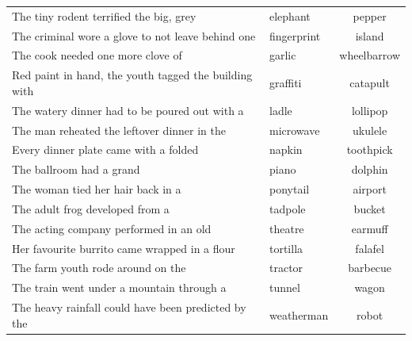 \begin{table}[!h]
\begin{tabular}{llc}
The tiny rodent terrified the big, grey                                      & elephant    & pepper      \\
The criminal wore a glove to not leave behind one                            & fingerprint & island      \\
The cook needed one more clove of                                            & garlic      & wheelbarrow \\
Red paint in hand, the youth tagged the building with                        & graffiti    & catapult    \\
The watery dinner had to be poured out with a                                & ladle       & lollipop    \\
The man reheated the leftover dinner in the                                  & microwave   & ukulele     \\
Every dinner plate came with a folded                                        & napkin      & toothpick   \\
The ballroom had a grand                                                     & piano       & dolphin     \\
The woman tied her hair back in a                                            & ponytail    & airport     \\
The adult frog developed from a                                              & tadpole     & bucket      \\
The acting company performed in an old                                       & theatre     & earmuff     \\
Her favourite burrito came wrapped in a flour                                & tortilla    & falafel     \\
The farm youth rode around on the                                            & tractor     & barbecue    \\
The train went under a mountain through a                                    & tunnel      & wagon       \\
The heavy rainfall could have been predicted by the                          & weatherman  & robot      \\
\bottomrule
\end{tabular}
\end{table}


